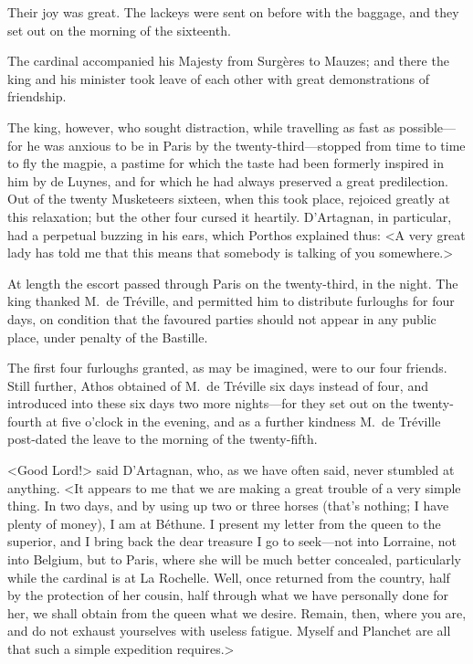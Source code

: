 Their joy was great. The lackeys were sent on before with the baggage, and they set out on the morning of the sixteenth. 

The cardinal accompanied his Majesty from Surgères to Mauzes; and there the king and his minister took leave of each other with great demonstrations of friendship. 

The king, however, who sought distraction, while travelling as fast as possible—for he was anxious to be in Paris by the twenty-third—stopped from time to time to fly the magpie, a pastime for which the taste had been formerly inspired in him by de Luynes, and for which he had always preserved a great predilection. Out of the twenty Musketeers sixteen, when this took place, rejoiced greatly at this relaxation; but the other four cursed it heartily. D'Artagnan, in particular, had a perpetual buzzing in his ears, which Porthos explained thus: <A very great lady has told me that this means that somebody is talking of you somewhere.> 

At length the escort passed through Paris on the twenty-third, in the night. The king thanked M.~de Tréville, and permitted him to distribute furloughs for four days, on condition that the favoured parties should not appear in any public place, under penalty of the Bastille. 

The first four furloughs granted, as may be imagined, were to our four friends. Still further, Athos obtained of M.~de Tréville six days instead of four, and introduced into these six days two more nights—for they set out on the twenty-fourth at five o'clock in the evening, and as a further kindness M.~de Tréville post-dated the leave to the morning of the twenty-fifth. 

<Good Lord!> said D'Artagnan, who, as we have often said, never stumbled at anything. <It appears to me that we are making a great trouble of a very simple thing. In two days, and by using up two or three horses (that's nothing; I have plenty of money), I am at Béthune. I present my letter from the queen to the superior, and I bring back the dear treasure I go to seek—not into Lorraine, not into Belgium, but to Paris, where she will be much better concealed, particularly while the cardinal is at La Rochelle. Well, once returned from the country, half by the protection of her cousin, half through what we have personally done for her, we shall obtain from the queen what we desire. Remain, then, where you are, and do not exhaust yourselves with useless fatigue. Myself and Planchet are all that such a simple expedition requires.> 

